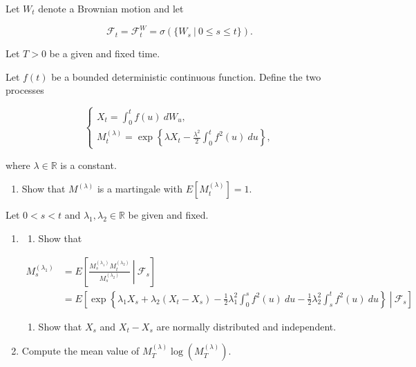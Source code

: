 \documentclass[
]{book}
\providecommand{\tightlist}{%
  \setlength{\itemsep}{0pt}\setlength{\parskip}{0pt}}
\begin{document}
Let \(W_t\) denote a Brownian motion and let

\[
\mathcal{F}_t=\mathcal{F}_t^W=\sigma(\{W_s\ \vert\ 0\le s\le t\}).
\]

Let \(T>0\) be a given and fixed time.

Let \(f(t)\) be a bounded deterministic continuous function. Define the two processes

\[
\begin{cases}
X_t=\int_0^tf(u)\ dW_u,\\
M^{(\lambda)}_t=\exp\left\{\lambda X_t-\frac{\lambda^2}{2}\int_0^t f^2(u)\ du\right\},
\end{cases}
\]

where \(\lambda\in\mathbb{R}\) is a constant.

\begin{enumerate}
\def\labelenumi{\alph{enumi}.}
\tightlist
\item
  Show that \(M^{(\lambda)}\) is a martingale with \(E[M_t^{(\lambda)}]=1\).
\end{enumerate}

Let \(0<s<t\) and \(\lambda_1,\lambda_2\in \mathbb{R}\) be given and fixed.

\begin{enumerate}
\def\labelenumi{\alph{enumi}.}
\setcounter{enumi}{1}
\item
  \begin{enumerate}
  \def\labelenumii{\roman{enumii}.}
  \tightlist
  \item
    Show that
  \end{enumerate}

  \begin{align*}
  M^{(\lambda_1)}_s&=E\left[\left.\frac{M^{(\lambda_1)}_sM^{(\lambda_2)}_t}{M^{(\lambda_2)}_s} \ \right\vert\ \mathcal{F}_s\right]\\
  &=E\left[\left.\exp\left\{\lambda_1X_s+\lambda_2(X_t-X_s)-\frac{1}{2}\lambda_1^2\int_0^sf^2(u)\ du- \frac{1}{2}\lambda_2^2\int_s^tf^2(u)\ du\right\} \ \right\vert\ \mathcal{F}_s\right]
  \end{align*}

  \begin{enumerate}
  \def\labelenumii{\roman{enumii}.}
  \setcounter{enumii}{1}
  \tightlist
  \item
    Show that \(X_s\) and \(X_t-X_s\) are normally distributed and independent.
  \end{enumerate}
\item
  Compute the mean value of \(M^{(\lambda)}_T\log(M^{(\lambda)}_T)\).
\end{enumerate}
\end{document}

